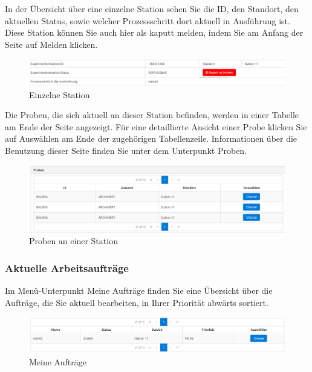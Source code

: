 \documentclass[enabledeprecatedfontcommands,fontsize=12pt,paper=a4,twoside]{scrartcl}
\begin{document}
In der Übersicht über eine einzelne Station sehen Sie die ID, den Standort, den aktuellen Status, sowie welcher Prozessschritt dort aktuell in Ausführung ist. Diese Station können Sie auch hier als kaputt melden, indem Sie am Anfang der Seite auf Melden klicken.\\

\begin{figure}[h!]
\begin{center}
 \includegraphics[width=\textwidth]{screenshots/t/stationformular.png}
  \caption{Einzelne Station}
  \label{fig:boat1}
\end{center}
\end{figure}

Die Proben, die sich aktuell an dieser Station befinden, werden in einer Tabelle am Ende der Seite angezeigt. Für eine detaillierte Ansicht einer Probe klicken Sie auf Auswählen am Ende der zugehörigen Tabellenzeile. Informationen über die Benutzung dieser Seite finden Sie unter dem Unterpunkt Proben. \\

\begin{figure}[h!]
\begin{center}
 \includegraphics[width=\textwidth]{screenshots/t/stationproben.png}
  \caption{Proben an einer Station}
  \label{fig:boat1}
\end{center}
\end{figure}


\subsubsection{Aktuelle Arbeitsaufträge}
Im Menü-Unterpunkt Meine Aufträge finden Sie eine Übersicht über die Aufträge, die Sie aktuell bearbeiten, in Ihrer Priorität abwärts sortiert. \\

\begin{figure}[h!]
\begin{center}
 \includegraphics[width=\textwidth]{screenshots/t/meineauftrage.png}
  \caption{Meine Aufträge}
  \label{fig:boat1}
\end{center}
\end{figure}
\end{document}
